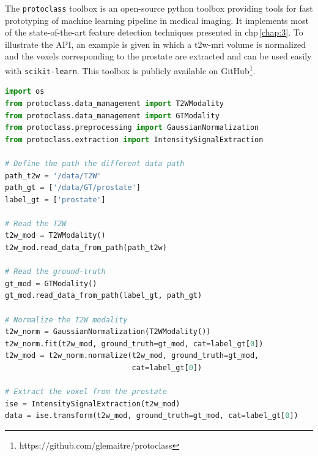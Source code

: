 The \texttt{protoclass} toolbox is an open-source python toolbox providing tools for fast prototyping of machine learning pipeline in medical imaging.
It implements most of the state-of-the-art feature detection techniques presented in \acs{chp}\,\ref{chap:3}.
To illustrate the API, an example is given in which a \ac{t2w}-\ac{mri} volume is normalized and the voxels corresponding to the prostate are extracted and can be used easily with \texttt{scikit-learn}.
This toolbox is publicly available on GitHub\footnote{https://github.com/glemaitre/protoclass}.

\begin{lstlisting}[language=Python, caption=Code snippet to normalize a volume and extract some voxels.]
import os
from protoclass.data_management import T2WModality
from protoclass.data_management import GTModality
from protoclass.preprocessing import GaussianNormalization
from protoclass.extraction import IntensitySignalExtraction

# Define the path the different data path
path_t2w = '/data/T2W'
path_gt = ['/data/GT/prostate']
label_gt = ['prostate']

# Read the T2W
t2w_mod = T2WModality()
t2w_mod.read_data_from_path(path_t2w)

# Read the ground-truth
gt_mod = GTModality()
gt_mod.read_data_from_path(label_gt, path_gt)

# Normalize the T2W modality
t2w_norm = GaussianNormalization(T2WModality())
t2w_norm.fit(t2w_mod, ground_truth=gt_mod, cat=label_gt[0])
t2w_mod = t2w_norm.normalize(t2w_mod, ground_truth=gt_mod,
                             cat=label_gt[0])

# Extract the voxel from the prostate
ise = IntensitySignalExtraction(t2w_mod)
data = ise.transform(t2w_mod, ground_truth=gt_mod, cat=label_gt[0])
\end{lstlisting}

